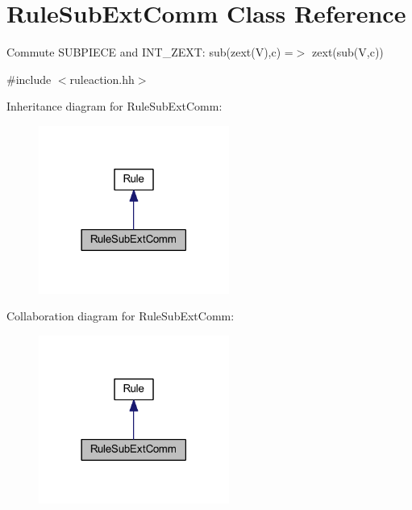 \hypertarget{class_rule_sub_ext_comm}{}\section{Rule\+Sub\+Ext\+Comm Class Reference}
\label{class_rule_sub_ext_comm}


Commute S\+U\+B\+P\+I\+E\+CE and I\+N\+T\+\_\+\+Z\+E\+XT\+: {\ttfamily sub(zext(\+V),c) =$>$ zext(sub(\+V,c))}  




{\ttfamily \#include $<$ruleaction.\+hh$>$}



Inheritance diagram for Rule\+Sub\+Ext\+Comm\+:
\nopagebreak
\begin{figure}[H]
\begin{center}
\leavevmode
\includegraphics[width=177pt]{class_rule_sub_ext_comm__inherit__graph}
\end{center}
\end{figure}


Collaboration diagram for Rule\+Sub\+Ext\+Comm\+:
\nopagebreak
\begin{figure}[H]
\begin{center}
\leavevmode
\includegraphics[width=177pt]{class_rule_sub_ext_comm__coll__graph}
\end{center}
\end{figure}
